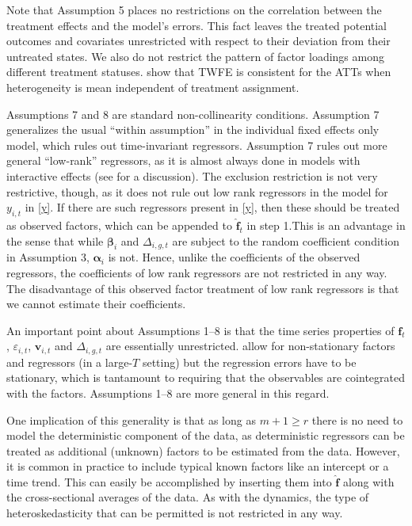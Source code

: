 \documentclass[12pt,fleqn]{article}
\def\*#1{\mathbf{#1}}
\def\+#1{\boldsymbol{#1}}
\begin{document}
\bigskip

Note that Assumption 5 places no restrictions on the correlation between the treatment effects and the model's errors. This fact leaves the treated potential outcomes and covariates unrestricted with respect to their deviation from their untreated states. We also do not restrict the pattern of factor loadings among different treatment statuses. \citet{brown2022generalized} show that TWFE is consistent for the ATTs when heterogeneity is mean independent of treatment assignment. 

Assumptions 7 and 8 are standard non-collinearity conditions. Assumption 7 generalizes the usual ``within assumption'' in the individual fixed effects only model, which rules out time-invariant regressors. Assumption 7 rules out more general ``low-rank'' regressors, as it is almost always done in models with interactive effects (see \citet{moon2015linear} for a discussion). The exclusion restriction is not very restrictive, though, as it does not rule out low rank regressors in the model for $y_{i,t}$ in \eqref{y}. If there are such regressors present in \eqref{y}, then these should be treated as observed factors, which can be appended to $\widehat{\*f}_t$ in step 1.This is an advantage in the sense that while $\+\beta_{i}$ and $\Delta_{i,g,t}$ are subject to the random coefficient condition in Assumption 3, $\+\alpha_i$ is not. Hence, unlike the coefficients of the observed regressors, the coefficients of low rank regressors are not restricted in any way. The disadvantage of this observed factor treatment of low rank regressors is that we cannot estimate their coefficients.

An important point about Assumptions 1--8 is that the time series properties of $\*f_t$, $\varepsilon_{i,t}$, $\*v_{i,t}$ and $\Delta_{i,g,t}$ are essentially unrestricted. \citet{chan2022pcdid} allow for non-stationary factors and regressors (in a large-$T$ setting) but the regression errors have to be stationary, which is tantamount to requiring that the observables are cointegrated with the factors. Assumptions 1--8 are more general in this regard.

One implication of this generality is that as long as $m+1\geq r$ there is no need to model the deterministic component of the data, as deterministic regressors can be treated as additional (unknown) factors to be estimated from the data. However, it is common in practice to include typical known factors like an intercept or a time trend. This can easily be accomplished by inserting them into $\widehat{\*f}$ along with the cross-sectional averages of the data. As with the dynamics, the type of heteroskedasticity that can be permitted is not restricted in any way.
\end{document}
